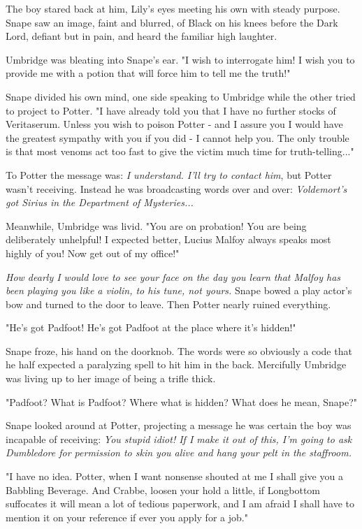 \documentclass[a4paper,11pt]{article}
\begin{document}
The boy stared back at him, Lily's eyes meeting his own with steady purpose. Snape saw an image, faint and blurred, of Black on his knees before the Dark Lord, defiant but in pain, and heard the familiar high laughter.

Umbridge was bleating into Snape's ear. "I wish to interrogate him! I wish you to provide me with a potion that will force him to tell me the truth!"

Snape divided his own mind, one side speaking to Umbridge while the other tried to project to Potter. "I have already told you that I have no further stocks of Veritaserum. Unless you wish to poison Potter - and I assure you I would have the greatest sympathy with you if you did - I cannot help you. The only trouble is that most venoms act too fast to give the victim much time for truth-telling..."

To Potter the message was: \emph{I understand. I'll try to contact him}, but Potter wasn't receiving. Instead he was broadcasting words over and over: \emph{Voldemort's got Sirius in the Department of Mysteries...}

Meanwhile, Umbridge was livid. "You are on probation! You are being deliberately unhelpful! I expected better, Lucius Malfoy always speaks most highly of you! Now get out of my office!"

\emph{How dearly I would love to see your face on the day you learn that Malfoy has been playing you like a violin, to his tune, not yours.} Snape bowed a play actor's bow and turned to the door to leave. Then Potter nearly ruined everything.

"He's got Padfoot! He's got Padfoot at the place where it's hidden!"

Snape froze, his hand on the doorknob. The words were so obviously a code that he half expected a paralyzing spell to hit him in the back. Mercifully Umbridge was living up to her image of being a trifle thick.

"Padfoot? What is Padfoot? Where what is hidden? What does he mean, Snape?"

Snape looked around at Potter, projecting a message he was certain the boy was incapable of receiving: \emph{You stupid idiot! If I make it out of this, I'm going to ask Dumbledore for permission to skin you alive and hang your pelt in the staffroom.}

"I have no idea. Potter, when I want nonsense shouted at me I shall give you a Babbling Beverage. And Crabbe, loosen your hold a little, if Longbottom suffocates it will mean a lot of tedious paperwork, and I am afraid I shall have to mention it on your reference if ever you apply for a job."
\end{document}
